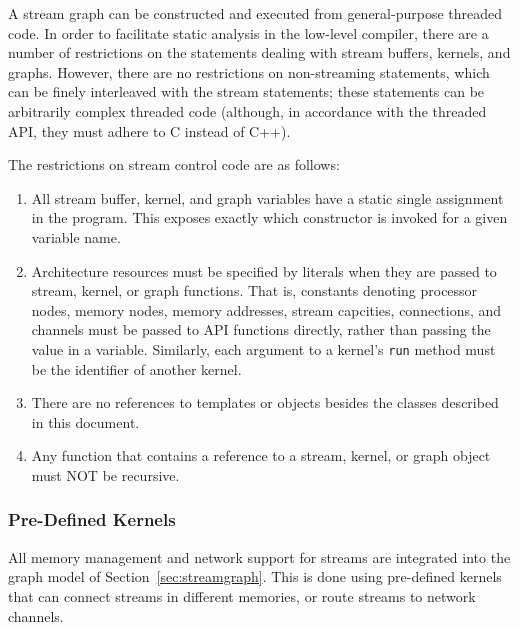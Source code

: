 
A stream graph can be constructed and executed from general-purpose
threaded code.  In order to facilitate static analysis in the
low-level compiler, there are a number of restrictions on the
statements dealing with stream buffers, kernels, and graphs.  However,
there are no restrictions on non-streaming statements, which can be
finely interleaved with the stream statements; these statements can be
arbitrarily complex threaded code (although, in accordance with the
threaded API, they must adhere to C instead of C++).

The restrictions on stream control code are as follows:

\begin{enumerate}

\item All stream buffer, kernel, and graph variables have a static
single assignment in the program.  This exposes exactly which
constructor is invoked for a given variable name.

\item Architecture resources must be specified by literals when they
are passed to stream, kernel, or graph functions.  That is, constants
denoting processor nodes, memory nodes, memory addresses, stream
capcities, connections, and channels must be passed to API functions
directly, rather than passing the value in a variable.  Similarly,
each argument to a kernel's {\tt run} method must be the identifier of
another kernel.

\item There are no references to templates or objects besides the
classes described in this document.

\item Any function that contains a reference to a stream, kernel, or
graph object must NOT be recursive.

\end{enumerate}

\subsubsection{Pre-Defined Kernels}
\label{sec:predef}

All memory management and network support for streams are integrated
into the graph model of Section~\ref{sec:streamgraph}.  This is done
using pre-defined kernels that can connect streams in different
memories, or route streams to network channels.

